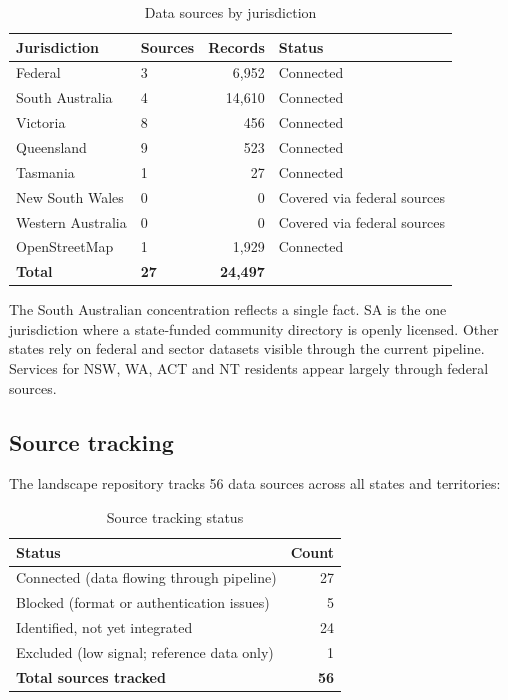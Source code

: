 \documentclass[11pt,a4paper]{article}
\newcommand{\theadstyle}{\cellcolor{headerbg}\textbf}
\begin{document}
\begin{table}[ht!]
\centering
\begin{tabular}{@{}llrl@{}}
\toprule
\rowcolor{headerbg} \theadstyle{Jurisdiction} & \theadstyle{Sources} & \theadstyle{Records} & \theadstyle{Status} \\
\midrule
Federal & 3 & 6,952 & Connected \\
South Australia & 4 & 14,610 & Connected \\
Victoria & 8 & 456 & Connected \\
Queensland & 9 & 523 & Connected \\
Tasmania & 1 & 27 & Connected \\
New South Wales & 0 & 0 & Covered via federal sources \\
Western Australia & 0 & 0 & Covered via federal sources \\
OpenStreetMap & 1 & 1,929 & Connected \\
\midrule
\textbf{Total} & \textbf{27} & \textbf{24,497} & \\
\bottomrule
\end{tabular}
\caption{Data sources by jurisdiction}
\end{table}

The South Australian concentration reflects a single fact. SA is the one jurisdiction where a state-funded community directory is openly licensed. Other states rely on federal and sector datasets visible through the current pipeline. Services for NSW, WA, ACT and NT residents appear largely through federal sources.

\subsection{Source tracking}

The landscape repository tracks 56 data sources across all states and territories:

\begin{table}[ht!]
\centering
\begin{tabular}{@{}lr@{}}
\toprule
\rowcolor{headerbg} \theadstyle{Status} & \theadstyle{Count} \\
\midrule
Connected (data flowing through pipeline) & 27 \\
Blocked (format or authentication issues) & 5 \\
Identified, not yet integrated & 24 \\
Excluded (low signal; reference data only) & 1 \\
\midrule
\textbf{Total sources tracked} & \textbf{56} \\
\bottomrule
\end{tabular}
\caption{Source tracking status}
\end{table}
\end{document}

